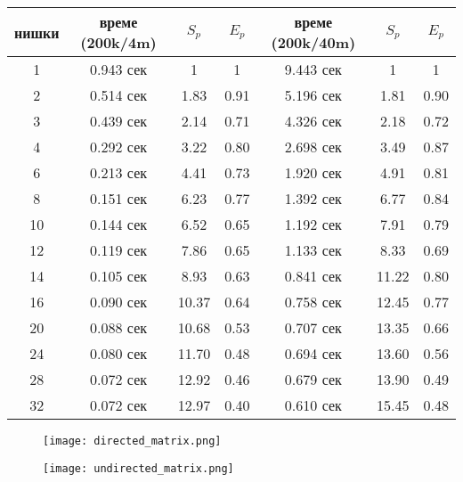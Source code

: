 \begin{center}
\begin{tabular}{ | c | c c c | c c c | }
  нишки & време (200k/4m) & $S_p$ & $E_p$ & време (200k/40m) & $S_p$ & $E_p$ \\
  \hline
  1  & 0.943 сек & 1     & 1    & 9.443 сек & 1 & 1 \\
  2  & 0.514 сек & 1.83  & 0.91 & 5.196 сек & 1.81 & 0.90 \\
  3  & 0.439 сек & 2.14  & 0.71 & 4.326 сек & 2.18 & 0.72 \\
  4  & 0.292 сек & 3.22  & 0.80 & 2.698 сек & 3.49 & 0.87 \\
  6  & 0.213 сек & 4.41  & 0.73 & 1.920 сек & 4.91 & 0.81 \\
  8  & 0.151 сек & 6.23  & 0.77 & 1.392 сек & 6.77 & 0.84 \\
  10 & 0.144 сек & 6.52  & 0.65 & 1.192 сек & 7.91 & 0.79 \\
  12 & 0.119 сек & 7.86  & 0.65 & 1.133 сек & 8.33 & 0.69 \\
  14 & 0.105 сек & 8.93  & 0.63 & 0.841 сек & 11.22 & 0.80 \\
  16 & 0.090 сек & 10.37 & 0.64 & 0.758 сек & 12.45 & 0.77 \\
  20 & 0.088 сек & 10.68 & 0.53 & 0.707 сек & 13.35 & 0.66 \\
  24 & 0.080 сек & 11.70 & 0.48 & 0.694 сек & 13.60 & 0.56 \\
  28 & 0.072 сек & 12.92 & 0.46 & 0.679 сек & 13.90 & 0.49 \\
  32 & 0.072 сек & 12.97 & 0.40 & 0.610 сек & 15.45 & 0.48 \\
\end{tabular}
\end{center}

\begin{figure}[H]
  \centering
  \begin{minipage}{.45\textwidth}
    \centering
    \texttt{[image: directed\_matrix.png]}
  \end{minipage}
  \begin{minipage}{.45\textwidth}
    \centering
    \texttt{[image: undirected\_matrix.png]}
  \end{minipage}
\end{figure}
